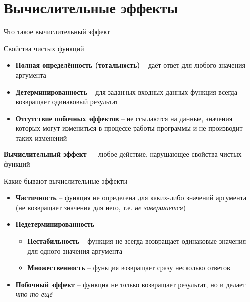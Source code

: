\documentclass{beamer}
\begin{document}
  \section{Вычислительные эффекты}
\begin{frame}{Что такое вычислительный эффект}
    \begin{block}{Свойства чистых функций}
      \begin{itemize}
          \item \textbf{Полная определённость (тотальность)} -- даёт ответ для любого значения аргумента
          \item \textbf{Детерминированность} -- для заданных входных данных функция всегда возвращает одинаковый результат
          \item \textbf{Отсутствие побочных эффектов} -- не ссылаются на данные, значения которых могут измениться в процессе работы программы и не производит таких изменений
      \end{itemize}
    \end{block}
    \textbf{Вычислительный эффект} --- любое действие, нарушающее свойства чистых функций
\end{frame}
\begin{frame}{Какие бывают вычислительные эффекты}
    \begin{itemize}
        \item \textbf{Частичность} -- функция не определена для каких-либо значений аргумента (не возвращает значения для него, т.е. \textit{не завершается})
        \item \textbf{Недетерминированность}
          \begin{itemize}
              \item \textbf{Нестабильность} -- функция не всегда возвращает одинаковые значения для одного значения аргумента
              \item \textbf{Множественность} -- функция возвращает сразу несколько ответов
          \end{itemize}
        \item \textbf{Побочный эффект} -- функция не только возвращает результат, но и делает \textit{что-то ещё}
    \end{itemize}
\end{frame}
\end{document}

